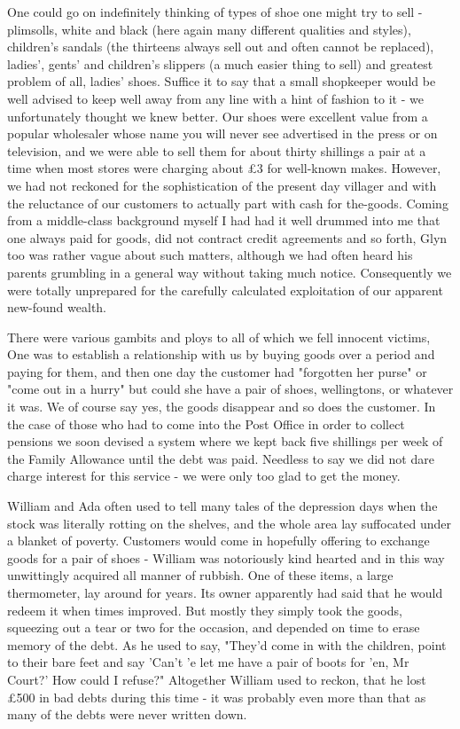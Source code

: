 One could go on indefinitely thinking of types of shoe one might try to sell - plimsolls, white and black (here again many different qualities and styles), children's sandals (the thirteens always sell out and often cannot be replaced), ladies', gents' and children's slippers (a much easier thing to sell) and greatest problem of all, ladies' shoes. Suffice it to say that a small shopkeeper would be well advised to keep well away from any line with a hint of fashion to it - we unfortunately thought we knew better. Our shoes were excellent value from a popular wholesaler whose name you will never see advertised in the press or on television, and we were able to sell them for about thirty shillings a pair at a time when most stores were charging about £3 for well-known makes. However, we had not reckoned for the sophistication of the present day villager and with the reluctance of our customers to actually part with cash for the-goods. Coming from a middle-class background myself I had had it well drummed into me that one always paid for goods, did not contract credit agreements and so forth, Glyn too was rather vague about such matters, although we had often heard his parents grumbling in a general way without taking much notice. Consequently we were totally unprepared for the carefully calculated exploitation of our apparent new-found wealth.

There were various gambits and ploys to all of which we fell innocent victims, One was to establish a relationship with us by buying goods over a period and paying for them, and then one day the customer had "forgotten her purse" or "come out in a hurry" but could she have a pair of shoes, wellingtons, or whatever it was. We of course say yes, the goods disappear and so does the customer. In the case of those who had to come into the Post Office in order to collect pensions we soon devised a system where we kept back five shillings per week of the Family Allowance until the debt was paid. Needless to say we did not dare charge interest for this service - we were only too glad to get the money.

William and Ada often used to tell many tales of the depression days when the stock was literally rotting on the shelves, and the whole area lay suffocated under a blanket of poverty. Customers would come in hopefully offering to exchange goods for a pair of shoes - William was notoriously kind hearted and in this way unwittingly acquired all manner of rubbish. One of these items, a large thermometer, lay around for years. Its owner apparently had said that he would redeem it when times improved. But mostly they simply took the goods, squeezing out a tear or two for the occasion, and depended on time to erase memory of the debt. As he used to say, "They'd come in with the children, point to their bare feet and say ’Can’t 'e let me have a pair of boots for ’en, Mr Court?' How could I refuse?" Altogether William used to reckon, that he lost £500 in bad debts during this time - it was probably even more than that as many of the debts were never written down.

